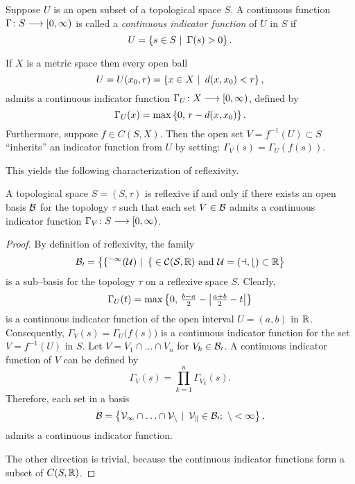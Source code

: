 \begin{defn}
Suppose $U$ is an open subset of a topological space $S$. A continuous
function $\Gamma\colon S \longrightarrow [0,\infty)$ is called a {\em continuous indicator
function} of $U$ in $S$ if
\[ U = \left\{s\in S \,\,|\,\,\, \Gamma(s) > 0\right\}.  \]
\end{defn}

\begin{rem}
If $X$ is a metric space then every open ball
\[ U=U(x_0,r)=\left\{x\in X \,\,|\,\,\, d(x,x_0) < r\right\}, \]
admits a continuous indicator function $\Gamma_U\colon{X}\longrightarrow[0,\infty)$, defined
by
\[ \Gamma_U(x) = \max\left\{0, \, r - d(x,x_0) \right\}. \]
Furthermore, suppose $f \in C(S,X)$. Then the open set $V=f^{-1}(U)\subset S$
``inherits'' an indicator function from $U$ by setting:
$\Gamma_V(s)=\Gamma_U(f(s))$.
\end{rem}

\smallskip
\goodbreak

This yields the following characterization of reflexivity.

\begin{prop} \label{p:REFLEX}
A topological space $S=(S,\tau)$ is reflexive if and only if there exists an
open basis $\cal B$ for the topology $\tau$ such that each set $V\in\cal B$
admits a continuous indicator function $\Gamma_V\colon{}S\longrightarrow[0,\infty)$.
\end{prop}

\begin{proof}
By definition of reflexivity, the family
\[ \cal B_0 = \left\{f^{-1}(U) \,\,|\,\,\, f \in C(S,\mathbb R) \text { and }
   U=(a,b) \subset \mathbb R \right\} \]
is a sub--basis for the topology $\tau$ on a reflexive space $S$. Clearly,
\[ \Gamma_U(t) = \max\left\{0, \, \tfrac{b-a}{2}-\left\vert\tfrac{a+b}{2}-t\right\vert\right\} \]
is a continuous indicator function of the open interval $U=(a,b)$ in $\mathbb R$.
Consequently, $\Gamma_V(s) = \Gamma_U\big(f(s)\big)$ is a continuous
indicator function for the set $V=f^{-1}(U)$ in $S$. Let $V=V_1
\cap\ldots\cap V_n$ for $V_k\in\cal{B}_0$. A continuous indicator function of
$V$ can be defined by
\[ \Gamma_V(s) = \prod_{k=1}^n \Gamma_{V_k}(s). \]
Therefore, each set in a basis
\[ \cal B = \left\{V_1 \cap\ldots\cap V_n \,\,|\,\,\, V_k\in\cal{B}_0;
   \,\, n < \infty\right\}, \]
admits a continuous indicator function.

\smallskip

The other direction is trivial, because the continuous indicator functions
form a subset of $C(S,\mathbb R)$.
\end{proof}

